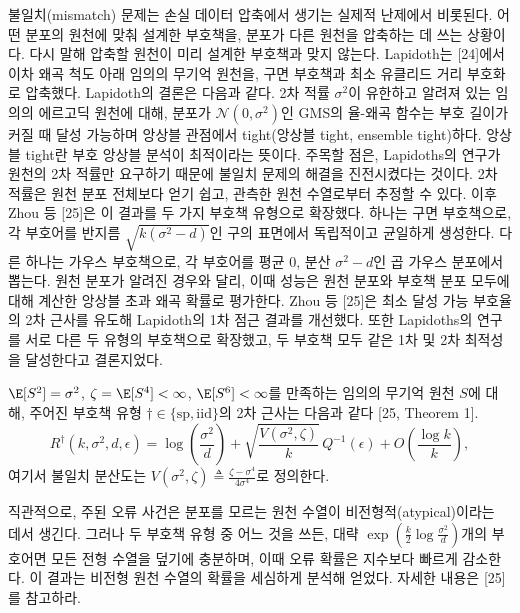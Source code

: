 불일치(mismatch) 문제는 손실 데이터 압축에서 생기는 실제적 난제에서 비롯된다.
어떤 분포의 원천에 맞춰 설계한 부호책을, 분포가 다른 원천을 압축하는 데 쓰는 상황이다.
다시 말해 압축할 원천이 미리 설계한 부호책과 맞지 않는다.
Lapidoth는 [24]에서 이차 왜곡 척도 아래 임의의 무기억 원천을, 구면 부호책과 최소 유클리드 거리 부호화로 압축했다.
Lapidoth의 결론은 다음과 같다. 2차 적률 $\sigma^2$이 유한하고 알려져 있는 임의의 에르고딕 원천에 대해, 분포가 $\mathcal{N}(0,\sigma^2)$인 GMS의 율-왜곡 함수는 부호 길이가 커질 때 달성 가능하며 앙상블 관점에서 tight(앙상블 tight, ensemble tight)하다.
앙상블 tight란 부호 앙상블 분석이 최적이라는 뜻이다.
주목할 점은, Lapidoths의 연구가 원천의 2차 적률만 요구하기 때문에 불일치 문제의 해결을 진전시켰다는 것이다.
2차 적률은 원천 분포 전체보다 얻기 쉽고, 관측한 원천 수열로부터 추정할 수 있다.
이후 Zhou 등 [25]은 이 결과를 두 가지 부호책 유형으로 확장했다.
하나는 구면 부호책으로, 각 부호어를 반지름 $\sqrt{k(\sigma^2-d)}$인 구의 표면에서 독립적이고 균일하게 생성한다.
다른 하나는 가우스 부호책으로, 각 부호어를 평균 0, 분산 $\sigma^2-d$인 곱 가우스 분포에서 뽑는다.
원천 분포가 알려진 경우와 달리, 이때 성능은 원천 분포와 부호책 분포 모두에 대해 계산한 앙상블 초과 왜곡 확률로 평가한다.
Zhou 등 [25]은 최소 달성 가능 부호율의 2차 근사를 유도해 Lapidoth의 1차 점근 결과를 개선했다.
또한 Lapidoths의 연구를 서로 다른 두 유형의 부호책으로 확장했고, 두 부호책 모두 같은 1차 및 2차 최적성을 달성한다고 결론지었다.

$\E[S^2]=\sigma^2$, $\zeta=\E[S^4]<\infty$, $\E[S^6]<\infty$를 만족하는 임의의 무기억 원천 $S$에 대해, 주어진 부호책 유형 $\dagger\in\{\mathrm{sp},\mathrm{iid}\}$의 2차 근사는 다음과 같다 [25, Theorem 1].
\begin{equation}
  R^\dagger(k,\sigma^2,d,\epsilon) = \log\left(\frac{\sigma^2}{d}\right) + \sqrt{\frac{V(\sigma^2,\zeta)}{k}}\,Q^{-1}(\epsilon) + O\left(\frac{\log k}{k}\right),
  \tag{15}
\end{equation}
여기서 불일치 분산도는 $V(\sigma^2,\zeta)\triangleq\frac{\zeta-\sigma^4}{4\sigma^4}$로 정의한다.

직관적으로, 주된 오류 사건은 분포를 모르는 원천 수열이 비전형적(atypical)이라는 데서 생긴다.
그러나 두 부호책 유형 중 어느 것을 쓰든, 대략 $\exp\left(\frac{k}{2}\log\frac{\sigma^2}{d}\right)$개의 부호어면 모든 전형 수열을 덮기에 충분하며, 이때 오류 확률은 지수보다 빠르게 감소한다.
이 결과는 비전형 원천 수열의 확률을 세심하게 분석해 얻었다.
자세한 내용은 [25]를 참고하라.

